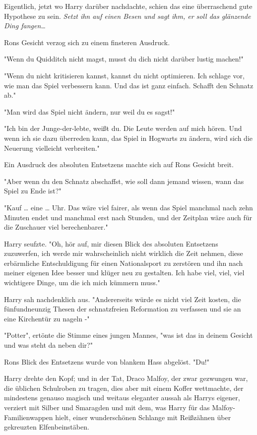 {Eigentlich, jetzt wo Harry darüber nachdachte, schien das eine überraschend gute Hypothese zu sein. \emph{Setzt ihn auf einen Besen und sagt ihm, er soll das glänzende Ding fangen…}

Rons Gesicht verzog sich zu einem finsteren Ausdruck.

"Wenn du Quidditch nicht magst, musst du dich nicht darüber lustig machen!"

"Wenn du nicht kritisieren kannst, kannst du nicht optimieren. Ich schlage vor, wie man das Spiel verbessern kann. Und das ist ganz einfach. Schafft den Schnatz ab."

"Man wird das Spiel nicht ändern, nur weil du es sagst!"

"Ich bin der Junge-der-lebte, weißt du. Die Leute werden auf mich hören. Und wenn ich sie dazu überreden kann, das Spiel in Hogwarts zu ändern, wird sich die Neuerung vielleicht verbreiten."

Ein Ausdruck des absoluten Entsetzens machte sich auf Rons Gesicht breit.

"Aber wenn du den Schnatz abschaffst, wie soll dann jemand wissen, wann das Spiel zu Ende ist?"

"Kauf … eine … Uhr. Das wäre viel fairer, als wenn das Spiel manchmal nach zehn Minuten endet und manchmal erst nach Stunden, und der Zeitplan wäre auch für die Zuschauer viel berechenbarer."

Harry seufzte. "Oh, hör auf, mir diesen Blick des absoluten Entsetzens zuzuwerfen, ich werde mir wahrscheinlich nicht wirklich die Zeit nehmen, diese erbärmliche Entschuldigung für einen Nationalsport zu zerstören und ihn nach meiner eigenen Idee besser und klüger neu zu gestalten. Ich habe viel, viel, viel wichtigere Dinge, um die ich mich kümmern muss."

Harry sah nachdenklich aus. "Andererseits würde es nicht viel Zeit kosten, die fünfundneunzig Thesen der schnatzfreien Reformation zu verfassen und sie an eine Kirchentür zu nageln -"

"Potter", ertönte die Stimme eines jungen Mannes, "was ist das in deinem Gesicht und was steht da neben dir?"

Rons Blick des Entsetzens wurde von blankem Hass abgelöst. "Du!"

Harry drehte den Kopf; und in der Tat, Draco Malfoy, der zwar gezwungen war, die üblichen Schulroben zu tragen, dies aber mit einem Koffer wettmachte, der mindestens genauso magisch und weitaus eleganter aussah als Harrys eigener, verziert mit Silber und Smaragden und mit dem, was Harry für das Malfoy-Familienwappen hielt, einer wunderschönen Schlange mit Reißzähnen über gekreuzten Elfenbeinstäben.

}
